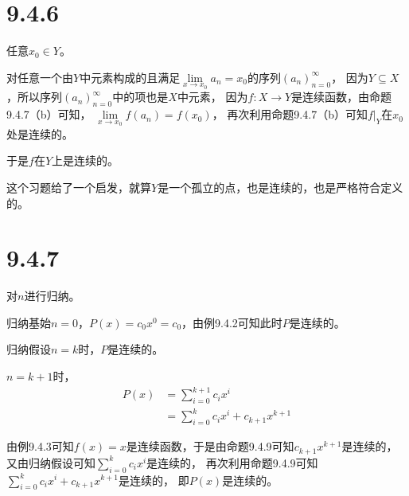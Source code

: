 \documentclass{article}
\begin{document}
\section*{9.4.6}

任意$x_0 \in Y$。

对任意一个由$Y$中元素构成的且满足$\lim\limits_{x \rightarrow x_0} a_n = x_0$的序列$(a_n)_{n=0}^\infty$，
因为$Y \subseteq X$，所以序列$(a_n)_{n=0}^\infty$中的项也是$X$中元素，
因为$f: X \rightarrow Y$是连续函数，由命题9.4.7（b）可知，
$\lim\limits_{x \rightarrow x_0} f(a_n) = f(x_0)$，
再次利用命题9.4.7（b）可知$f|_{Y}$在$x_0$处是连续的。

于是$f$在$Y$上是连续的。

\begin{zremark}
  这个习题给了一个启发，就算$Y$是一个孤立的点，也是连续的，也是严格符合定义的。
\end{zremark}

\section*{9.4.7}

对$n$进行归纳。

归纳基始$n = 0$，$P(x) = c_0 x^0 = c_0$，由例9.4.2可知此时$P$是连续的。

归纳假设$n = k$时，$P$是连续的。

$n = k+1$时，
\begin{align*}
  P(x) & = \sum\limits_{i=0}^{k+1}c_i x^i                \\
       & = \sum\limits_{i=0}^{k}c_i x^i + c_{k+1}x^{k+1}
\end{align*}

由例9.4.3可知$f(x) = x$是连续函数，于是由命题9.4.9可知$c_{k+1}x^{k+1}$是连续的，
又由归纳假设可知$\sum\limits_{i=0}^{k}c_i x^i$是连续的，
再次利用命题9.4.9可知$\sum\limits_{i=0}^{k}c_i x^i + c_{k+1}x^{k+1}$是连续的，
即$P(x)$是连续的。
\end{document}
